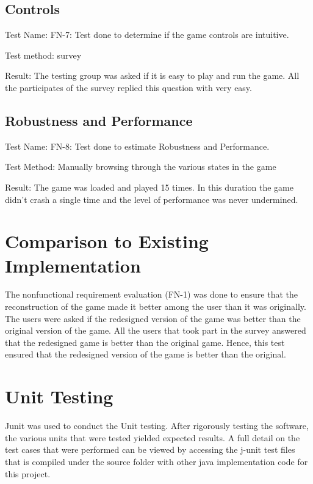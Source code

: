 \documentclass{article}
\begin{document}
\vspace{5mm}


\subsection { Controls}
Test Name: FN-7: Test done to determine if the game controls are intuitive. \par
Test method: survey \par
Result: The testing group was asked if it is easy to play and run the game. All the participates of the survey replied this question with very easy. \par

\vspace{5mm}


\subsection {Robustness and Performance}
Test Name: FN-8: Test done to estimate Robustness and Performance. \par
Test Method: Manually browsing through the various states in the game \par
Result: The game was loaded and played 15 times. In this duration the game didn’t crash a single time and the level of performance was never undermined. \par

\vspace{5mm}


\section{Comparison to Existing Implementation} 
The nonfunctional requirement evaluation (FN-1) was done to ensure that the reconstruction of the game made it better among the user than it was originally. The users were asked if the redesigned version of the game was better than the original version of the game. All the users that took part in the survey answered that the redesigned game is better than the original game. Hence, this test ensured that the redesigned version of the game is better than the original. 

\section{Unit Testing}
Junit was used to conduct the Unit testing. After rigorously testing the software, the various units that were tested yielded expected results. A full detail on the test cases that were performed can be viewed by accessing the j-unit test files that is compiled under the source folder with other java implementation code for this project.
\end{document}
